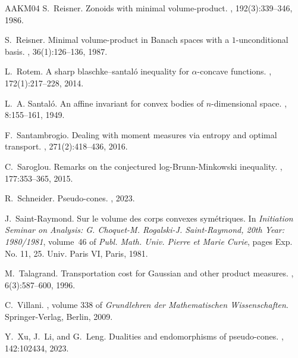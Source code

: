 \documentclass[10pt]{amsart}
\theoremstyle{definition}
\theoremstyle{remark}
\begin{document}
\begin{thebibliography}{AAKM04}
S.~Reisner.
\newblock Zonoids with minimal volume-product.
, 192(3):339--346, 1986.

S.~Reisner.
\newblock Minimal volume-product in {B}anach spaces with a {$1$}-unconditional
  basis.
, 36(1):126--136, 1987.

L.~Rotem.
\newblock A sharp blaschke--santal{\'o} inequality for $\alpha$-concave
  functions.
, 172(1):217--228, 2014.

L.~A. Santal\'{o}.
\newblock An affine invariant for convex bodies of {$n$}-dimensional space.
, 8:155--161, 1949.

F.~Santambrogio.
\newblock Dealing with moment measures via entropy and optimal transport.
, 271(2):418--436, 2016.

C.~Saroglou.
\newblock Remarks on the conjectured log-{B}runn-{M}inkowski inequality.
, 177:353--365, 2015.

R.~Schneider.
\newblock Pseudo-cones.
, 2023.

J.~Saint-Raymond.
\newblock Sur le volume des corps convexes sym\'{e}triques.
\newblock In {\em Initiation {S}eminar on {A}nalysis: {G}. {C}hoquet-{M}.
  {R}ogalski-{J}. {S}aint-{R}aymond, 20th {Y}ear: 1980/1981}, volume~46 of {\em
  Publ. Math. Univ. Pierre et Marie Curie}, pages Exp. No. 11, 25. Univ. Paris
  VI, Paris, 1981.

M.~Talagrand.
\newblock Transportation cost for {Gaussian} and other product measures.
, 6(3):587--600, 1996.

C.~Villani.
, volume 338 of {\em Grundlehren
  der Mathematischen Wissenschaften}.
\newblock Springer-Verlag, Berlin, 2009.

Y.~Xu, J.~Li, and G.~Leng.
\newblock Dualities and endomorphisms of pseudo-cones.
, 142:102434, 2023.

\end{thebibliography}
\end{document}
